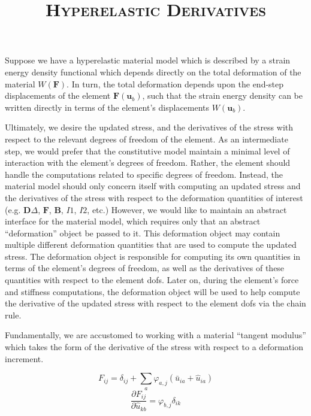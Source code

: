 \documentclass[11pt]{article} %
\title{\textsc{Hyperelastic Derivatives}}
\author{}
\date{}
\begin{document}
\maketitle

Suppose we have a hyperelastic material model which is described by a strain energy density functional which depends directly on the total deformation of the material $W(\mathbf{F})$. In turn, the total deformation depends upon the end-step displacements of the element $\mathbf{F} (\mathbf{u}_b)$, such that the strain energy density can be written directly in terms of the element's displacements $W(\mathbf{u}_b)$.

Ultimately, we desire the updated stress, and the derivatives of the stress with respect to the relevant degrees of freedom of the element. As an intermediate step, we would prefer that the constitutive model maintain a minimal level of interaction with the element's degrees of freedom. Rather, the element should handle the computations related to specific degrees of freedom. Instead, the material model should only concern itself with computing an updated stress and the derivatives of the stress with respect to the deformation quantities of interest (e.g. $\mathbf{D} \Delta$, $\mathbf{F}$, $\mathbf{B}$, $I1$, $I2$, etc.) However, we would like to maintain an abstract interface for the material model, which requires only that an abstract ``deformation'' object be passed to it. This deformation object may contain multiple different deformation quantities that are used to compute the updated stress. The deformation object is responsible for computing its own quantities in terms of the element's degrees of freedom, as well as the derivatives of these quantities with respect to the element dofs. Later on, during the element's force and stiffness computations, the deformation object will be used to help compute the derivative of the updated stress with respect to the element dofs via the chain rule.

Fundamentally, we are accustomed to working with a material ``tangent modulus'' which takes the form of the derivative of the stress with respect to a deformation increment. 

\begin{equation}
	F_{ij} = \delta_{ij} + \sum_a \varphi_{a,j} (\bar{u}_{ia} + \hat{u}_{ia})
\end{equation}
\begin{equation}
	\frac{\partial F_{ij}}{\partial \hat{u}_{kb}} = \varphi_{b,j} \delta_{ik}
\end{equation}
\end{document}
